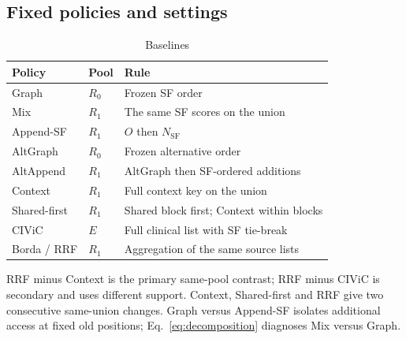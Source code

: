 \subsection{Fixed policies and settings}
\begin{table}[t]
\caption{Baselines}
\label{tab:baselines}
\centering\small
\setlength{\tabcolsep}{4pt}
\begin{tabularx}{\textwidth}{@{}llX@{}}
\toprule
Policy & Pool & Rule \\
\midrule
Graph & $R_0$ & Frozen SF order \\
Mix & $R_1$ & The same SF scores on the union \\
Append-SF & $R_1$ & $O$ then $N_{\mathrm{SF}}$ \\
AltGraph & $R_0$ & Frozen alternative order \\
AltAppend & $R_1$ & AltGraph then SF-ordered additions \\
Context & $R_1$ & Full context key on the union \\
Shared-first & $R_1$ & Shared block first; Context within blocks \\
CIViC & $E$ & Full clinical list with SF tie-break \\
Borda / RRF & $R_1$ & Aggregation of the same source lists \\
\bottomrule
\end{tabularx}
\end{table}
RRF minus Context is the primary same-pool contrast; RRF minus CIViC is secondary and uses different support. Context, Shared-first and RRF give two consecutive same-union changes. Graph versus Append-SF isolates additional access at fixed old positions; Eq.~\ref{eq:decomposition} diagnoses Mix versus Graph.


